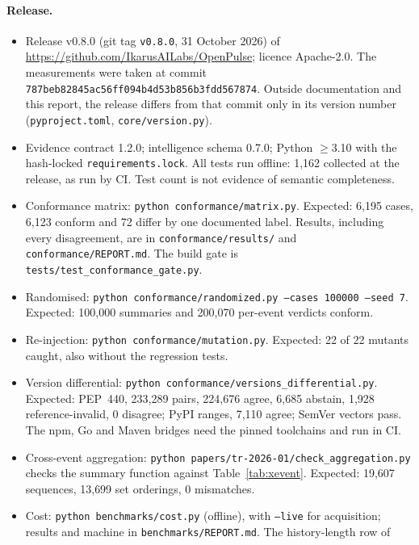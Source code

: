 \documentclass[11pt,a4paper]{article}
\newcommand{\code}[1]{\texttt{#1}}
\newcommand{\release}{v0.8.0}
\begin{document}
\paragraph{Release.}
\begin{itemize}[leftmargin=*,nosep]
  \item Release \release{} (git tag \code{\release{}}, 31 October 2026)
    of \url{https://github.com/IkarusAILabs/OpenPulse}; licence
    Apache-2.0. The measurements were taken at commit
    \code{787beb82845ac56ff094b4d53b856b3fdd567874}. Outside
    documentation and this report, the release differs from that commit
    only in its version number (\code{pyproject.toml},
    \code{core/version.py}).
  \item Evidence contract 1.2.0; intelligence schema 0.7.0; Python
    $\ge$3.10 with the hash-locked \code{requirements.lock}. All tests
    run offline: 1{,}162 collected at the release, as run by CI. Test
    count is not evidence of semantic completeness.
  \item Conformance matrix: \code{python conformance/matrix.py}.
    Expected: 6{,}195 cases, 6{,}123 conform and 72 differ by one
    documented label. Results, including every disagreement, are in
    \code{conformance/results/} and \code{conformance/REPORT.md}. The
    build gate is \code{tests/test\_conformance\_gate.py}.
  \item Randomised: \code{python conformance/randomized.py --cases
    100000 --seed 7}. Expected: 100{,}000 summaries and 200{,}070
    per-event verdicts conform.
  \item Re-injection: \code{python conformance/mutation.py}. Expected:
    22 of 22 mutants caught, also without the regression tests.
  \item Version differential: \code{python
    conformance/versions\_differential.py}. Expected: PEP~440, 233{,}289
    pairs, 224{,}676 agree, 6{,}685 abstain, 1{,}928 reference-invalid,
    0 disagree; PyPI ranges, 7{,}110 agree; SemVer vectors pass. The
    npm, Go and Maven bridges need the pinned toolchains and run in CI.
  \item Cross-event aggregation: \code{python
    papers/tr-2026-01/check\_aggregation.py} checks the summary
    function against Table~\ref{tab:xevent}. Expected: 19{,}607
    sequences, 13{,}699 set orderings, 0 mismatches.
  \item Cost: \code{python benchmarks/cost.py} (offline), with
    \code{--live} for acquisition; results and machine in
    \code{benchmarks/REPORT.md}. The history-length row of

\end{itemize}
\end{document}
